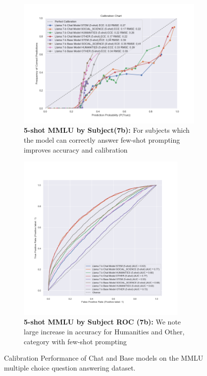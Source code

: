 \documentclass[11pt]{article}
\begin{document}
\begin{figure}
     \hfill
     \begin{subfigure}[b]{0.60\textwidth}
         \centering
         \includegraphics[width=1.1\textwidth]{figures/5-shot-MMLU-subjects-7b.png}
         \caption{\textbf{5-shot MMLU by Subject(7b):}  For subjects which the model can correctly 
         answer few-shot prompting improves accuracy and calibration}
         \label{fig:5-shot-MMLU-subjects-7b}
     \end{subfigure}     
    \hfill 
     \begin{subfigure}[b]{0.38\textwidth}
         \centering \includegraphics[width=0.9\textwidth]{figures/5-shot-MMLU-subjects-7b-roc.png}
         \caption{\textbf{5-shot MMLU by Subject ROC (7b):} We note large increase in accuracy for 
         Humanities and Other, category with few-shot prompting}
         \label{fig:5-shot-MMLU-subjects-7b-roc}
    \end{subfigure} 
        \caption{Calibration Performance of Chat and Base models on the MMLU multiple choice question answering dataset.}
        \label{fig:MMLU-subjects-7b}
\end{figure}
\end{document}
